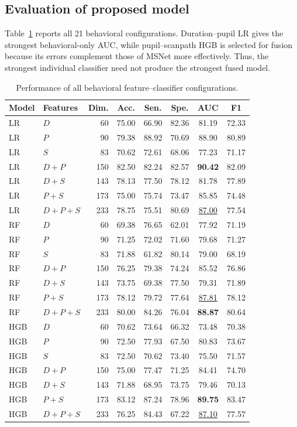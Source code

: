 \documentclass[conference,a4paper]{IEEEtran}
\begin{document}
\subsection{Evaluation of proposed model}
Table~\ref{tab:ml_results} reports all 21 behavioral configurations. Duration--pupil LR gives the strongest behavioral-only AUC, while pupil--scanpath HGB is selected for fusion because its errors complement those of MSNet more effectively. Thus, the strongest individual classifier need not produce the strongest fused model.

\begin{table}[t]
\caption{Performance of all behavioral feature--classifier configurations.}
\label{tab:ml_results}
\centering
\footnotesize
\setlength{\tabcolsep}{4.2pt}
\begin{tabular}{llrccccc}
\toprule
Model & Features & Dim. & Acc. & Sen. & Spe. & AUC & F1 \\
\midrule
LR & $D$ & 60 & 75.00 & 66.90 & 82.36 & 81.19 & 72.33 \\
LR & $P$ & 90 & 79.38 & 88.92 & 70.69 & 88.90 & 80.89 \\
LR & $S$ & 83 & 70.62 & 72.61 & 68.06 & 77.23 & 71.17 \\
LR & $D+P$ & 150 & 82.50 & 82.24 & 82.57 & \textbf{90.42} & 82.09 \\
LR & $D+S$ & 143 & 78.13 & 77.50 & 78.12 & 81.78 & 77.89 \\
LR & $P+S$ & 173 & 75.00 & 75.74 & 73.47 & 85.85 & 74.48 \\
LR & $D+P+S$ & 233 & 78.75 & 75.51 & 80.69 & \underline{87.00} & 77.54 \\
\midrule
RF & $D$ & 60 & 69.38 & 76.65 & 62.01 & 77.92 & 71.19 \\
RF & $P$ & 90 & 71.25 & 72.02 & 71.60 & 79.68 & 71.27 \\
RF & $S$ & 83 & 71.88 & 61.82 & 80.14 & 79.00 & 68.19 \\
RF & $D+P$ & 150 & 76.25 & 79.38 & 74.24 & 85.52 & 76.86 \\
RF & $D+S$ & 143 & 73.75 & 69.38 & 77.50 & 79.31 & 71.89 \\
RF & $P+S$ & 173 & 78.12 & 79.72 & 77.64 & \underline{87.81} & 78.12 \\
RF & $D+P+S$ & 233 & 80.00 & 84.26 & 76.04 & \textbf{88.87} & 80.64 \\
\midrule
HGB & $D$ & 60 & 70.62 & 73.64 & 66.32 & 73.48 & 70.38 \\
HGB & $P$ & 90 & 72.50 & 77.93 & 67.50 & 80.83 & 73.67 \\
HGB & $S$ & 83 & 72.50 & 70.62 & 73.40 & 75.50 & 71.57 \\
HGB & $D+P$ & 150 & 75.00 & 77.47 & 71.25 & 84.41 & 74.70 \\
HGB & $D+S$ & 143 & 71.88 & 68.95 & 73.75 & 79.46 & 70.13 \\
HGB & $P+S$ & 173 & 83.12 & 87.24 & 78.96 & \textbf{89.75} & 83.47 \\
HGB & $D+P+S$ & 233 & 76.25 & 84.43 & 67.22 & \underline{87.10} & 77.57 \\
\bottomrule
\end{tabular}
\end{table}
\end{document}
